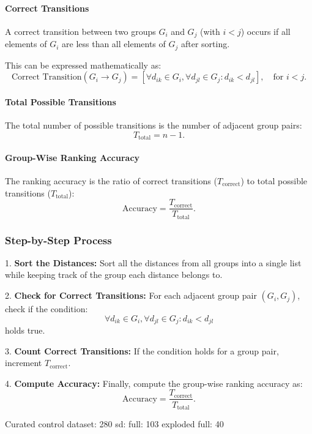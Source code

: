 \paragraph{Correct Transitions}
A correct transition between two groups \( G_i \) and \( G_j \) (with \( i < j \)) occurs if all elements of \( G_i \) are less than all elements of \( G_j \) after sorting.  

This can be expressed mathematically as:
\[
\text{Correct Transition}(G_i \to G_j) = 
\left[
\forall d_{ik} \in G_i, \forall d_{jl} \in G_j : d_{ik} < d_{jl}
\right], \quad \text{for } i < j.
\]

\paragraph{Total Possible Transitions}
The total number of possible transitions is the number of adjacent group pairs:
\[
T_{\text{total}} = n - 1.
\]

\paragraph{Group-Wise Ranking Accuracy}
The ranking accuracy is the ratio of correct transitions (\( T_{\text{correct}} \)) to total possible transitions (\( T_{\text{total}} \)):
\[
\text{Accuracy} = \frac{T_{\text{correct}}}{T_{\text{total}}}.
\]

\subsubsection*{Step-by-Step Process}

1. \textbf{Sort the Distances:} Sort all the distances from all groups into a single list while keeping track of the group each distance belongs to.

2. \textbf{Check for Correct Transitions:} For each adjacent group pair \( (G_i, G_j) \), check if the condition:
\[
\forall d_{ik} \in G_i, \forall d_{jl} \in G_j : d_{ik} < d_{jl}
\]
holds true.

3. \textbf{Count Correct Transitions:} If the condition holds for a group pair, increment \( T_{\text{correct}} \).

4. \textbf{Compute Accuracy:} Finally, compute the group-wise ranking accuracy as:
\[
\text{Accuracy} = \frac{T_{\text{correct}}}{T_{\text{total}}}.
\]






Curated control dataset: 280
sd: full: 103
exploded full: 40

